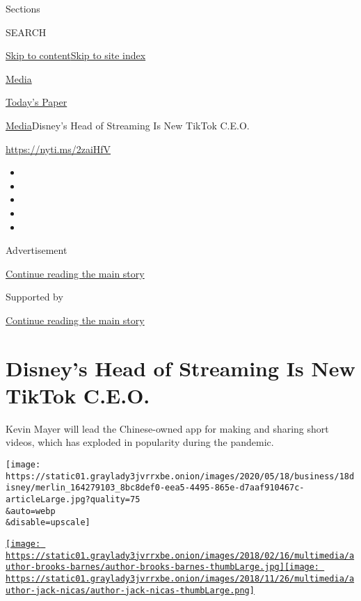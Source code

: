 Sections

SEARCH

\protect\hyperlink{site-content}{Skip to
content}\protect\hyperlink{site-index}{Skip to site index}

\href{https://www.nytimes3xbfgragh.onion/section/business/media}{Media}

\href{https://myaccount.nytimes3xbfgragh.onion/auth/login?response_type=cookie\&client_id=vi}{}

\href{https://www.nytimes3xbfgragh.onion/section/todayspaper}{Today's
Paper}

\href{/section/business/media}{Media}\textbar{}Disney's Head of
Streaming Is New TikTok C.E.O.

\href{https://nyti.ms/2zaiHfV}{https://nyti.ms/2zaiHfV}

\begin{itemize}
\item
\item
\item
\item
\item
\end{itemize}

Advertisement

\protect\hyperlink{after-top}{Continue reading the main story}

Supported by

\protect\hyperlink{after-sponsor}{Continue reading the main story}

\hypertarget{disneys-head-of-streaming-is-new-tiktok-ceo}{%
\section{Disney's Head of Streaming Is New TikTok
C.E.O.}\label{disneys-head-of-streaming-is-new-tiktok-ceo}}

Kevin Mayer will lead the Chinese-owned app for making and sharing short
videos, which has exploded in popularity during the pandemic.

\texttt{[image: https://static01.graylady3jvrrxbe.onion/images/2020/05/18/business/18disney/merlin\_164279103\_8bc8def0-eea5-4495-865e-d7aaf910467c-articleLarge.jpg?quality=75\\\&auto=webp\\\&disable=upscale]}

\href{https://www.nytimes3xbfgragh.onion/by/brooks-barnes}{\texttt{[image: https://static01.graylady3jvrrxbe.onion/images/2018/02/16/multimedia/author-brooks-barnes/author-brooks-barnes-thumbLarge.jpg]}}\href{https://www.nytimes3xbfgragh.onion/by/jack-nicas}{\texttt{[image: https://static01.graylady3jvrrxbe.onion/images/2018/11/26/multimedia/author-jack-nicas/author-jack-nicas-thumbLarge.png]}}

